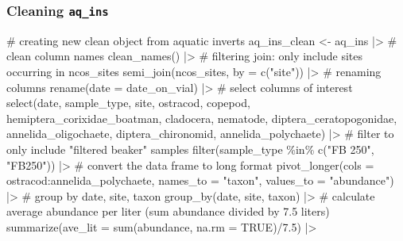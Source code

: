 \documentclass[
  letterpaper,
  DIV=11,
  numbers=noendperiod]{scrartcl}
\newenvironment{Shaded}{\begin{snugshade}}{\end{snugshade}}
\newcommand{\AttributeTok}[1]{\textcolor[rgb]{0.40,0.45,0.13}{#1}}
\newcommand{\CommentTok}[1]{\textcolor[rgb]{0.37,0.37,0.37}{#1}}
\newcommand{\ConstantTok}[1]{\textcolor[rgb]{0.56,0.35,0.01}{#1}}
\newcommand{\FloatTok}[1]{\textcolor[rgb]{0.68,0.00,0.00}{#1}}
\newcommand{\FunctionTok}[1]{\textcolor[rgb]{0.28,0.35,0.67}{#1}}
\newcommand{\NormalTok}[1]{\textcolor[rgb]{0.00,0.23,0.31}{#1}}
\newcommand{\OtherTok}[1]{\textcolor[rgb]{0.00,0.23,0.31}{#1}}
\newcommand{\SpecialCharTok}[1]{\textcolor[rgb]{0.37,0.37,0.37}{#1}}
\newcommand{\StringTok}[1]{\textcolor[rgb]{0.13,0.47,0.30}{#1}}
\begin{document}
\subsubsection{\texorpdfstring{Cleaning
\texttt{aq\_ins}}{Cleaning aq\_ins}}\label{cleaning-aq_ins}

\begin{Shaded}
\begin{Highlighting}[]
\CommentTok{\# creating new clean object from aquatic inverts}
\NormalTok{aq\_ins\_clean }\OtherTok{\textless{}{-}}\NormalTok{ aq\_ins }\SpecialCharTok{|\textgreater{}} 
  \CommentTok{\# clean column names}
  \FunctionTok{clean\_names}\NormalTok{() }\SpecialCharTok{|\textgreater{}} 
  \CommentTok{\# filtering join: only include sites occurring in ncos\_sites}
  \FunctionTok{semi\_join}\NormalTok{(ncos\_sites, }\AttributeTok{by =} \FunctionTok{c}\NormalTok{(}\StringTok{"site"}\NormalTok{)) }\SpecialCharTok{|\textgreater{}} 
  \CommentTok{\# renaming columns}
  \FunctionTok{rename}\NormalTok{(}\AttributeTok{date =}\NormalTok{ date\_on\_vial) }\SpecialCharTok{|\textgreater{}} 
  \CommentTok{\# select columns of interest}
  \FunctionTok{select}\NormalTok{(date, sample\_type, site,}
\NormalTok{         ostracod,}
\NormalTok{         copepod,}
\NormalTok{         hemiptera\_corixidae\_boatman,}
\NormalTok{         cladocera,}
\NormalTok{         nematode,}
\NormalTok{         diptera\_ceratopogonidae, }
\NormalTok{         annelida\_oligochaete,}
\NormalTok{         diptera\_chironomid,}
\NormalTok{         annelida\_polychaete) }\SpecialCharTok{|\textgreater{}} 
  \CommentTok{\# filter to only include "filtered beaker" samples}
  \FunctionTok{filter}\NormalTok{(sample\_type }\SpecialCharTok{\%in\%} \FunctionTok{c}\NormalTok{(}\StringTok{"FB 250"}\NormalTok{, }\StringTok{"FB250"}\NormalTok{)) }\SpecialCharTok{|\textgreater{}} 
  \CommentTok{\# convert the data frame to long format}
  \FunctionTok{pivot\_longer}\NormalTok{(}\AttributeTok{cols =}\NormalTok{ ostracod}\SpecialCharTok{:}\NormalTok{annelida\_polychaete,}
               \AttributeTok{names\_to =} \StringTok{"taxon"}\NormalTok{,}
               \AttributeTok{values\_to =} \StringTok{"abundance"}\NormalTok{) }\SpecialCharTok{|\textgreater{}} 
  \CommentTok{\# group by date, site, taxon}
  \FunctionTok{group\_by}\NormalTok{(date, site, taxon) }\SpecialCharTok{|\textgreater{}} 
  \CommentTok{\# calculate average abundance per liter (sum abundance divided by 7.5 liters)}
  \FunctionTok{summarize}\NormalTok{(}\AttributeTok{ave\_lit =} \FunctionTok{sum}\NormalTok{(abundance, }\AttributeTok{na.rm =} \ConstantTok{TRUE}\NormalTok{)}\SpecialCharTok{/}\FloatTok{7.5}\NormalTok{) }\SpecialCharTok{|\textgreater{}} 

\end{Highlighting}
\end{Shaded}
\end{document}
